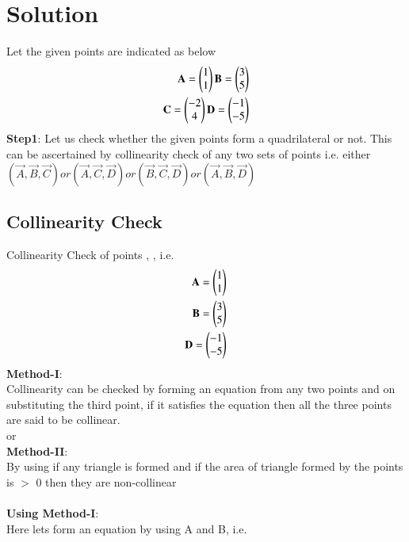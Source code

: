 \documentclass[journal,12pt,twocolumn]{IEEEtran}
\begin{document}
\section{Solution}
Let the given points are indicated as below\\

\begin{align}
\mathbf{\textbf{A}} = \begin{pmatrix}1 \\ 1\end{pmatrix}
\mathbf{\textbf{B}} = \begin{pmatrix}3 \\ 5\end{pmatrix}\\
\mathbf{\textbf{C}} = \begin{pmatrix}-2 \\ 4\end{pmatrix}
\mathbf{\textbf{D}} = \begin{pmatrix}-1 \\ -5\end{pmatrix}\\
\end{align}
\textbf{Step1}: Let us check whether the given points form a quadrilateral or not. This can be ascertained by collinearity check of any two sets of points i.e.
						either \begin{math}
						    	(\vec{A}, \vec{B}, \vec{C}) or (\vec{A}, \vec{C}, \vec{D}) or (\vec{B}, \vec{C}, \vec{D}) or (\vec{A}, \vec{B}, \vec{D})					\end{math}

\subsection{\textbf{Collinearity Check}}
Collinearity Check of points , ,  i.e. 
\begin{align}
\mathbf{A} = \begin{pmatrix}1 \\ 1\end{pmatrix}\\
\mathbf{B} = \begin{pmatrix}3 \\ 5\end{pmatrix}\\
\mathbf{D} = \begin{pmatrix}-1 \\ -5\end{pmatrix}\\
\end{align}
\textbf{Method-I}:
\\Collinearity can be checked by forming an equation from any two points and on substituting the third point, if it satisfies the equation then all the three points are said to be collinear. \\ or\\
\textbf{Method-II}:
\\ By using if any triangle is formed and if the area of triangle formed by the points is $>$ 0 then they are non-collinear
\\
\\
\textbf{Using Method-I}:\\
Here lets form an equation by using A and B, i.e.  
\\
\end{document}

